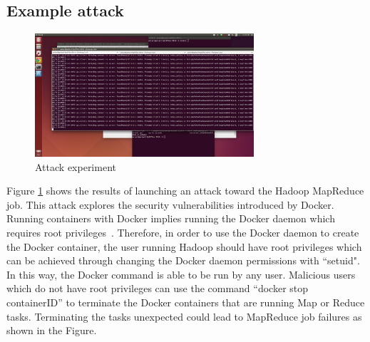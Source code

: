 \subsection{Example attack}
\begin{figure}[t]
  \centering
  \includegraphics[width=3.2in]{figs/attack.png}
  \caption{Attack experiment}
  \label{fig:AttackOverview}
\end{figure}
Figure \ref{fig:AttackOverview} shows the results of launching an attack toward the Hadoop MapReduce job. This attack explores the security vulnerabilities introduced by Docker. Running containers with Docker implies running the Docker daemon which requires root privileges~\cite{rootdocker}. Therefore, in order to use the Docker daemon to create the Docker container, the user running Hadoop should have root privileges which can be achieved through changing the Docker daemon permissions with ``setuid". In this way, the Docker command is able to be run by any user. Malicious users which do not have root privileges can use the command ``docker stop containerID” to terminate the Docker containers that are running Map or Reduce tasks. Terminating the tasks unexpected could lead to MapReduce job failures as shown in the Figure.

